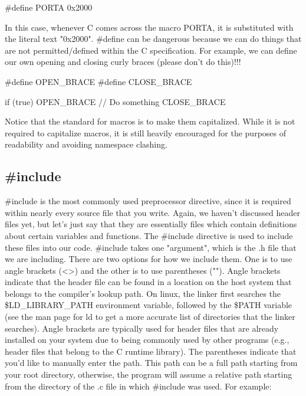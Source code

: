 \documentclass{article}
\begin{document}
\begin{clst}
#define PORTA 0x2000
\end{clst}

In this case, whenever C comes across the macro PORTA, it is substituted with the literal text "0x2000".
\#define can be dangerous because we can do things that are not permitted/defined within the C specification.
For example, we can define our own opening and closing curly braces (please don't do this)!!!

\begin{clst}
#define OPEN_BRACE {
#define CLOSE_BRACE }

if (true) OPEN_BRACE
// Do something
CLOSE_BRACE
\end{clst}

Notice that the standard for macros is to make them capitalized. While it is not required to capitalize
macros, it is still heavily encouraged for the purposes of readability and avoiding namespace clashing.

\subsection{\#include}

\#include is the most commonly used preprocessor directive, since it is required within nearly every source
file that you write. Again, we haven't discussed header files yet, but let's just say that they are essentially
files which contain definitions about certain variables and functions. The \#include directive is used to
include these files into our code. \#include takes one "argument", which is the .h file that we are including.
There are two options for how we include them. One is to use angle brackets (<>) and the other is to use
parentheses (""). Angle brackets indicate that the header file can be found in a location on the host system
that belongs to the compiler's lookup path. On linux, the linker first searches the \$LD\_LIBRARY\_PATH
environment variable, followed by the \$PATH variable (see the man page for ld to get a more accurate list of
directories that the linker searches). Angle brackets are typically used for header files that are already
installed on your system due to being commonly used by other programs (e.g., header files that belong to the C
runtime library). The parentheses indicate that you'd like to manually enter the path. This path can be a full
path starting from your root directory, otherwise, the program will assume a relative path starting from the
directory of the .c file in which \#include was used. For example:
\end{document}
